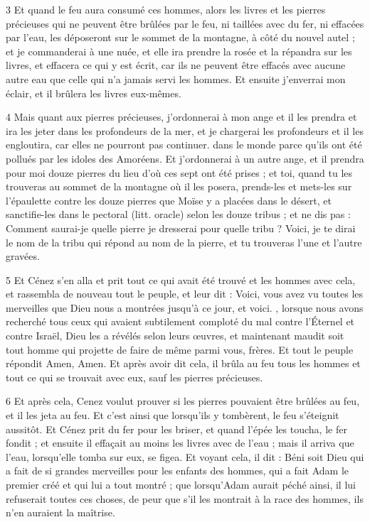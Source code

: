 \par 3 Et quand le feu aura consumé ces hommes, alors les livres et les pierres précieuses qui ne peuvent être brûlées par le feu, ni taillées avec du fer, ni effacées par l'eau, les déposeront sur le sommet de la montagne, à côté du nouvel autel ; et je commanderai à une nuée, et elle ira prendre la rosée et la répandra sur les livres, et effacera ce qui y est écrit, car ils ne peuvent être effacés avec aucune autre eau que celle qui n'a jamais servi les hommes. Et ensuite j'enverrai mon éclair, et il brûlera les livres eux-mêmes.

\par 4 Mais quant aux pierres précieuses, j'ordonnerai à mon ange et il les prendra et ira les jeter dans les profondeurs de la mer, et je chargerai les profondeurs et il les engloutira, car elles ne pourront pas continuer. dans le monde parce qu'ils ont été pollués par les idoles des Amoréens. Et j'ordonnerai à un autre ange, et il prendra pour moi douze pierres du lieu d'où ces sept ont été prises ; et toi, quand tu les trouveras au sommet de la montagne où il les posera, prends-les et mets-les sur l'épaulette contre les douze pierres que Moïse y a placées dans le désert, et sanctifie-les dans le pectoral (litt. oracle) selon les douze tribus ; et ne dis pas : Comment saurai-je quelle pierre je dresserai pour quelle tribu ? Voici, je te dirai le nom de la tribu qui répond au nom de la pierre, et tu trouveras l'une et l'autre gravées.

\par 5 Et Cénez s'en alla et prit tout ce qui avait été trouvé et les hommes avec cela, et rassembla de nouveau tout le peuple, et leur dit : Voici, vous avez vu toutes les merveilles que Dieu nous a montrées jusqu'à ce jour, et voici. , lorsque nous avons recherché tous ceux qui avaient subtilement comploté du mal contre l'Éternel et contre Israël, Dieu les a révélés selon leurs œuvres, et maintenant maudit soit tout homme qui projette de faire de même parmi vous, frères. Et tout le peuple répondit Amen, Amen. Et après avoir dit cela, il brûla au feu tous les hommes et tout ce qui se trouvait avec eux, sauf les pierres précieuses.

\par 6 Et après cela, Cenez voulut prouver si les pierres pouvaient être brûlées au feu, et il les jeta au feu. Et c'est ainsi que lorsqu'ils y tombèrent, le feu s'éteignit aussitôt. Et Cénez prit du fer pour les briser, et quand l'épée les toucha, le fer fondit ; et ensuite il effaçait au moins les livres avec de l'eau ; mais il arriva que l'eau, lorsqu'elle tomba sur eux, se figea. Et voyant cela, il dit : Béni soit Dieu qui a fait de si grandes merveilles pour les enfants des hommes, qui a fait Adam le premier créé et qui lui a tout montré ; que lorsqu'Adam aurait péché ainsi, il lui refuserait toutes ces choses, de peur que s'il les montrait à la race des hommes, ils n'en auraient la maîtrise.

